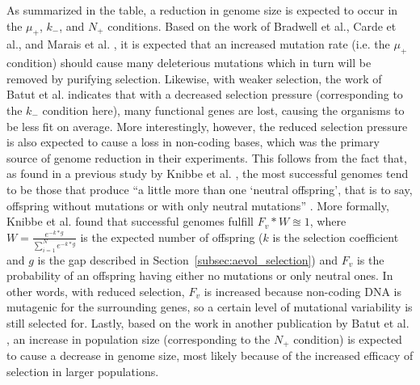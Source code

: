 As summarized in the table, a reduction in genome size is expected to occur in the $\mu_+$, $k_-$, and $N_+$ conditions. Based on the work of Bradwell et al., Carde et al., and Marais et al. \cite{bradwell2013correlation, carde.2019, marais2008mutation}, it is expected that an increased mutation rate (i.e. the $\mu_+$ condition) should cause many deleterious mutations which in turn will be removed by purifying selection. Likewise, with weaker selection, the work of Batut et al. \cite{Batut.2013} indicates that with a decreased selection pressure (corresponding to the $k_-$ condition here), many functional genes are lost, causing the organisms to be less fit on average. More interestingly, however, the reduced selection pressure is also expected to cause a loss in non-coding bases, which was the primary source of genome reduction in their experiments. This follows from the fact that, as found in a previous study by Knibbe et al. \cite{Knibbe2007}, the most successful genomes tend to be those that produce ``a little more than one `neutral offspring', that is to say, offspring without mutations or with only neutral mutations'' \cite{Batut.2013}. More formally, Knibbe et al. found that successful genomes fulfill $F_v*W \approxeq 1$, where $W=\frac{e^{-k*g}}{\sum_{i=1}^{N}e^{-k*g}}$ is the expected number of offspring ($k$ is the selection coefficient and $g$ is the gap described in Section~\ref{subsec:aevol_selection}) and $F_v$ is the probability of an offspring having either no mutations or only neutral ones. In other words, with reduced selection, $F_v$ is increased because non-coding DNA is mutagenic for the surrounding genes, so a certain level of mutational variability is still selected for. Lastly, based on the work in another publication by Batut et al. \cite{Batut.2014}, an increase in population size (corresponding to the $N_+$ condition) is expected to cause a decrease in genome size, most likely because of the increased efficacy of selection in larger populations. 
